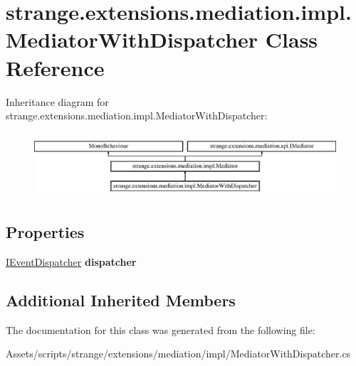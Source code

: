 \hypertarget{classstrange_1_1extensions_1_1mediation_1_1impl_1_1_mediator_with_dispatcher}{\section{strange.\-extensions.\-mediation.\-impl.\-Mediator\-With\-Dispatcher Class Reference}
\label{classstrange_1_1extensions_1_1mediation_1_1impl_1_1_mediator_with_dispatcher}
}
Inheritance diagram for strange.\-extensions.\-mediation.\-impl.\-Mediator\-With\-Dispatcher\-:\begin{figure}[H]
\begin{center}
\leavevmode
\includegraphics[height=2.420749cm]{classstrange_1_1extensions_1_1mediation_1_1impl_1_1_mediator_with_dispatcher}
\end{center}
\end{figure}
\subsection*{Properties}
\begin{DoxyCompactItemize}
\item 
\hypertarget{classstrange_1_1extensions_1_1mediation_1_1impl_1_1_mediator_with_dispatcher_aeb3d141a61e5d3cfbf86b2de02f54163}{\hyperlink{interfacestrange_1_1extensions_1_1dispatcher_1_1eventdispatcher_1_1api_1_1_i_event_dispatcher}{I\-Event\-Dispatcher} {\bfseries dispatcher}}\label{classstrange_1_1extensions_1_1mediation_1_1impl_1_1_mediator_with_dispatcher_aeb3d141a61e5d3cfbf86b2de02f54163}

\end{DoxyCompactItemize}
\subsection*{Additional Inherited Members}


The documentation for this class was generated from the following file\-:\begin{DoxyCompactItemize}
\item 
Assets/scripts/strange/extensions/mediation/impl/Mediator\-With\-Dispatcher.\-cs\end{DoxyCompactItemize}
